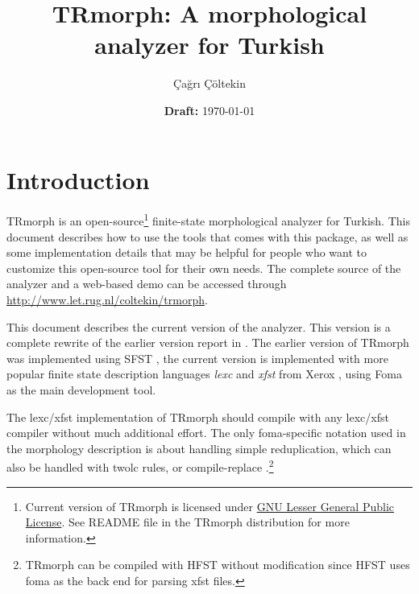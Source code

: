 \documentclass[twocolumn]{article}
\title{TRmorph: A morphological analyzer for Turkish}
\author{Çağrı Çöltekin}
\date{\textbf{Draft:} \today}
\begin{document}


\section{Introduction}

TRmorph is an open-source\footnote{Current version of TRmorph is
licensed under \href{http://www.gnu.org/licenses/lgpl.html}{GNU Lesser
General Public License}. See README file in the TRmorph distribution
for more information.} finite-state morphological analyzer for
Turkish.  This document describes how to use the tools that comes with
this package, as well as some implementation details that may be
helpful for people who want to customize this open-source tool for
their own needs.  The complete source of the analyzer and a web-based
demo can be accessed through \url{http://www.let.rug.nl/coltekin/trmorph}. 

This document describes the current version of the analyzer.  This
version is a complete rewrite of the earlier version report in
\cite{coltekin2010}.  The earlier version of TRmorph was implemented
using SFST \parencite{schmid2005}, the current version is implemented
with more popular finite state description languages \emph{lexc} and
\emph{xfst} from Xerox \parencite{beesley2003}, using Foma
\parencite{hulden2009} as the main development tool. 

The lexc/xfst implementation of TRmorph should compile with any
lexc/xfst compiler without much additional effort.  The only
foma-specific notation used in the morphology description is about
handling simple reduplication, which can also be handled with twolc
rules, or compile-replace \parencite{beesley2003}.\footnote{TRmorph
can be compiled with HFST \parencite{linden2009} without modification
since HFST uses foma as the back end for parsing xfst files.}
\end{document}
